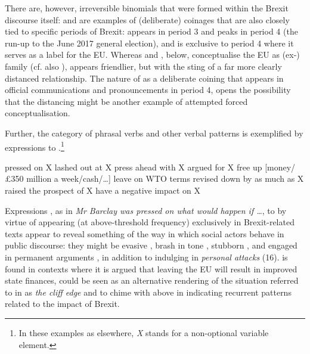 \documentclass[output=paper]{langscibook}
\begin{document}
There are, however, irreversible binomials that were formed within the Brexit discourse itself:  and  are examples of (deliberate) coinages that are also closely tied to specific periods of Brexit:  appears in period 3 and peaks in period 4 (the run-up to the June 2017 general election), and  is exclusive to period 4 where it serves as a label for the EU. Whereas  and , below, conceptualise the EU as (ex-) family (cf. also \citealt{Islentyeva2019}),  appears friendlier, but with the sting of a far more clearly distanced relationship. The nature of  as a deliberate coining that appears in official communications and pronouncements in period 4, opens the possibility that the distancing might be another example of attempted forced conceptualisation.

Further, the category of phrasal verbs and other verbal patterns is exemplified by expressions  to .\footnote{In these examples as elsewhere, \textit{X} stands for a non-optional variable element.}

\ea pressed on X\label{ex:buerki:23}
\ex lashed out at X\label{ex:buerki:24}
\ex press ahead with X\label{ex:buerki:25}
\ex argued for X\label{ex:buerki:26}
\ex free up [money/£350 million a week/cash/…]\label{ex:buerki:27}
\ex leave on WTO terms\label{ex:buerki:28}
\ex revised down\label{ex:buerki:29}
\ex{} by as much as X\label{ex:buerki:30}
\ex raised the prospect of X\label{ex:buerki:31}
\ex have a negative impact on X\label{ex:buerki:32}
\z

Expressions , as in \textit{Mr Barclay was pressed on what would happen if …}, to  by virtue of appearing (at above-threshold frequency) exclusively in Brexit-related texts appear to reveal something of the way in which social actors behave in public discourse: they might be evasive , brash in tone , stubborn , and engaged in permanent arguments , in addition to indulging in \textit{personal attacks} (16).  is found in contexts where it is argued that leaving the EU will result in improved state finances,  could be seen as an alternative rendering of the situation referred to in  as \textit{the cliff edge} and  to  chime with  above in indicating recurrent patterns related to the impact of Brexit. 
\end{document}
